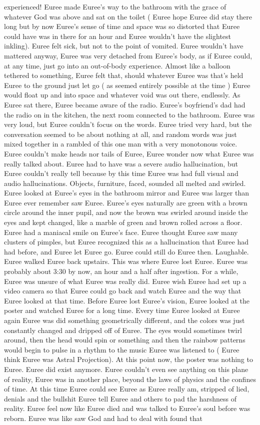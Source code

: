 \documentclass[12pt]{book}
\begin{document}
experienced! Euree made Euree's way to the bathroom with the grace of whatever God was above and sat on the toilet ( Euree hope Euree did stay there long but by now Euree's sense of time and space was so distorted that Euree could have was in there for an hour and Euree wouldn't have the slightest inkling). Euree felt sick, but not to the point of vomited. Euree wouldn't have mattered anyway, Euree was very detached from Euree's body, as if Euree could, at any time, just go into an out-of-body experience. Almost like a balloon tethered to something, Euree felt that, should whatever Euree was that's held Euree to the ground just let go ( as seemed entirely possible at the time ) Euree would float up and into space and whatever void was out there, endlessly. As Euree sat there, Euree became aware of the radio. Euree's boyfriend's dad had the radio on in the kitchen, the next room connected to the bathroom. Euree was very loud, but Euree couldn't focus on the words. Euree tried very hard, but the conversation seemed to be about nothing at all, and random words was just mixed together in a rambled of this one man with a very monotonous voice. Euree couldn't make heads nor tails of Euree, Euree wonder now what Euree was really talked about. Euree had to have was a severe audio hallucination, but Euree couldn't really tell because by this time Euree was had full visual and audio hallucinations. Objects, furniture, faced, sounded all melted and swirled. Euree looked at Euree's eyes in the bathroom mirror and Euree was larger than Euree ever remember saw Euree. Euree's eyes naturally are green with a brown circle around the inner pupil, and now the brown was swirled around inside the eyes and kept changed, like a marble of green and brown rolled across a floor. Euree had a maniacal smile on Euree's face. Euree thought Euree saw many clusters of pimples, but Euree recognized this as a hallucination that Euree had had before, and Euree let Euree go. Euree could still do Euree then. Laughable. Euree walked Euree back upstairs. This was where Euree lost Euree. Euree was probably about 3:30 by now, an hour and a half after ingestion. For a while, Euree was unsure of what Euree was really did. Euree wish Euree had set up a video camera so that Euree could go back and watch Euree and the way that Euree looked at that time. Before Euree lost Euree's vision, Euree looked at the poster and watched Euree for a long time. Every time Euree looked at Euree again Euree was did something geometrically different, and the colors was just constantly changed and dripped off of Euree. The eyes would sometimes twirl around, then the head would spin or something and then the rainbow patterns would begin to pulse in a rhythm to the music Euree was listened to ( Euree think Euree was Astral Projection). At this point now, the poster was nothing to Euree. Euree did exist anymore. Euree couldn't even see anything on this plane of reality, Euree was in another place, beyond the laws of physics and the confines of time. At this time Euree could see Euree as Euree really am, stripped of lied, denials and the bullshit Euree tell Euree and others to pad the harshness of reality. Euree feel now like Euree died and was talked to Euree's soul before was reborn. Euree was like saw God and had to deal with found that 
\end{document}
